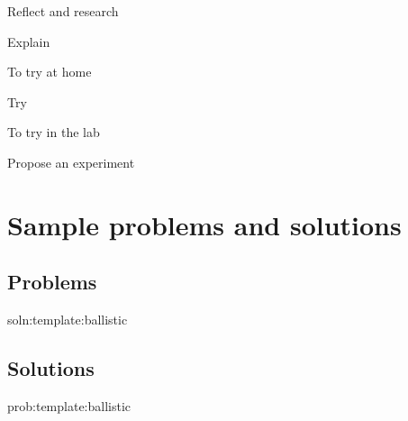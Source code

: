 \begin{chapteractivity}{Reflect and research}
{
\item Explain
}
\end{chapteractivity}

\begin{chapteractivity}{To try at home}
{
\item Try
}
\end{chapteractivity}

\begin{chapteractivity}{To try in the lab}
{
\item Propose an experiment
}
\end{chapteractivity}

\newpage
\section{Sample problems and solutions}
\subsection{Problems}
\begin{problem}{soln:template:ballistic}{\label{prob:template:ballistic} 

}
\end{problem}

\newpage
\subsection{Solutions}
\begin{solution}{prob:template:ballistic}\label{soln:template:ballistic}

\end{solution}

